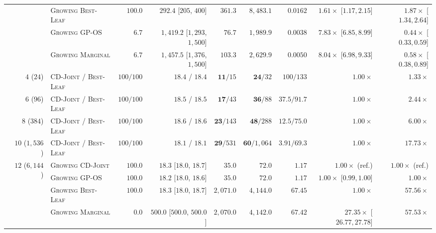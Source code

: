 \documentclass{article}
\theoremstyle{plain}
\theoremstyle{definition}
\begin{document}
\begin{table}[!htbp]
{\begin{tabular}{@{}lrlrrrrrrr@{}}
  & & \textsc{Growing Best-Leaf}  & $100.0$          & $292.4$ [$205$, $400$]            & $361.3$ & $8{,}483.1$ & $0.0162$          & $1.61\times$ [$1.17, 2.15$] & $1.87\times$ [$1.34, 2.64$] \\
  & & \textsc{Growing GP-OS}      & $6.7$            & $1{,}419.2$ [$1{,}293$, $1{,}500$] & $76.7$  & $1{,}989.9$ & $0.0038$          & $7.83\times$ [$6.85, 8.99$] & $0.44\times$ [$0.33, 0.59$] \\
  & & \textsc{Growing Marginal}   & $6.7$            & $1{,}457.5$ [$1{,}376$, $1{,}500$] & $103.3$ & $2{,}629.9$ & $0.0050$          & $8.04\times$ [$6.98, 9.33$] & $0.58\times$ [$0.38, 0.89$] \\
\midrule
{}
  & $4$ ($24$)               & \textsc{CD-Joint} / \textsc{Best-Leaf} & $100 / 100$ & $18.4$ / $18.4$ & $\mathbf{11} / 15$ & $\mathbf{24} / 32$         & $100 / 133$  & $1.00\times$ & $1.33\times$ \\
  & $6$ ($96$)               & \textsc{CD-Joint} / \textsc{Best-Leaf} & $100 / 100$ & $18.5$ / $18.5$ & $\mathbf{17} / 43$ & $\mathbf{36} / 88$         & $37.5 / 91.7$ & $1.00\times$ & $2.44\times$ \\
  & $8$ ($384$)              & \textsc{CD-Joint} / \textsc{Best-Leaf} & $100 / 100$ & $18.6$ / $18.6$ & $\mathbf{23} / 143$ & $\mathbf{48} / 288$       & $12.5 / 75.0$ & $1.00\times$ & $6.00\times$ \\
  & $10$ ($1{,}536$)         & \textsc{CD-Joint} / \textsc{Best-Leaf} & $100 / 100$ & $18.1$ / $18.1$ & $\mathbf{29} / 531$ & $\mathbf{60} / 1{,}064$   & $3.91 / 69.3$ & $1.00\times$ & $17.73\times$ \\
  & 
    & \textsc{Growing CD-Joint}   & $\mathbf{100.0}$ & $\mathbf{18.3}$ [$18.0$, $18.7$] & $\mathbf{35.0}$ & $\mathbf{72.0}$ & $\mathbf{1.17}$ & $1.00\times$ (ref.) & $1.00\times$ (ref.) \\
  & & \textsc{Growing GP-OS}      & $100.0$          & $18.2$ [$18.0$, $18.6$]          & $35.0$          & $72.0$          & $1.17$          & $1.00\times$ [$0.99, 1.00$] & $1.00\times$ \\
  & & \textsc{Growing Best-Leaf}  & $100.0$          & $18.3$ [$18.0$, $18.7$]          & $2{,}071.0$     & $4{,}144.0$     & $67.45$         & $1.00\times$ & $\mathbf{57.56\times}$ \\
  & & \textsc{Growing Marginal}   & $0.0$            & $500.0$ [$500.0$, $500.0$]       & $2{,}070.0$     & $4{,}142.0$     & $67.42$         & $27.35\times$ [$26.77, 27.78$] & $57.53\times$ \\
\bottomrule
\end{tabular}%
}
\end{table}
\end{document}
